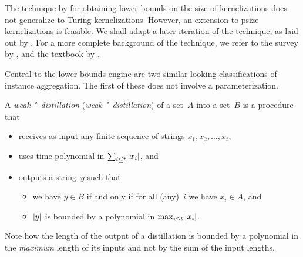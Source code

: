 The technique by \textcite{bodlaender2009problems} for obtaining lower bounds on the size of kernelizations does not generalize to Turing kernelizations.
However, an extension to psize kernelizations is feasible.
We shall adapt a later iteration of the technique, as laid out by \textcite[][Section~3]{bodlaender2014kernelization}.
For a more complete background of the technique, we refer to the survey by \textcite{kratsch2014recent}, and the textbook by \textcite{fomin2019kernelization}.

Central to the lower bounds engine are two similar looking classifications of instance aggregation.
The first of these does not involve a parameterization.
\begin{definition}
  A \emph{weak "~distillation} (\emph{weak "~distillation}) of a set~$A$ into a set~$B$ is a procedure that
  \begin{itemize}
  \item receives as input any finite sequence of strings $x_1, x_2, \ldots, x_t$,
  \item uses time polynomial in $\sum_{i \le t} {\lvert x_i\rvert}$, and
  \item outputs a string~$y$ such that
    \begin{itemize}
    \item we have $y \in B$ if and only if for all (any)~$i$ we have $x_i \in A$, and
    \item ${\lvert y\rvert}$ is bounded by a polynomial in $\max_{i \le t} {\lvert x_i\rvert}$.
    \end{itemize}
  \end{itemize}
\end{definition}

Note how the length of the output of a distillation is bounded by a polynomial in the \emph{maximum} length of its inputs and not by the sum of the input lengths.

